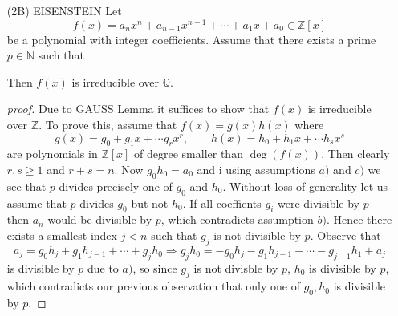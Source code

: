 \documentclass[]{scrartcl}
\newcommand{\Z}{\mathbb{Z}}
\newcommand{\<}{\trianglelefteq}
\begin{document}
\begin{itemize}
\begin{proof}[proof]
		We may therefore assume without loss of generality that $ p $ divides all coefficients of $ g'(x) $. 
		Hence we can write $ g'(x) = p g''(x) $ where $ g''(x) $ is again contained in $ \Z[x] $. 
		We may now divide the equation $ n f(x) = p g''(x) h'(x) $ by $ p $, and still remain within 
		$ \Z[x] $. Proceeding in this way we see that we can factorise $ f(x) $ over $ \Z[x] $.
	\end{proof}
	\begin{proof}[proof sketch]
	\end{proof}
	\item[(2B)] EISENSTEIN Let 
	$$ 
	f(x) = a_n x^n + a_{n - 1}x^{n - 1} + \cdots + a_1 x + a_0 \in \mathbb{Z}[x] 
	$$ 
	be a polynomial with integer coefficients. Assume that there exists a prime $ p \in \mathbb{N} $ 
	such that 
	Then $ f(x) $ is irreducible over $ \mathbb{Q} $. 
	\begin{proof}[proof]
		Due to GAUSS Lemma it 
		suffices to show that $ f(x) $ is irreducible over $ \mathbb{Z} $. To prove 
		this, assume that $ f(x) = g(x) h(x) $ where 
		$$
		g(x) = g_0 + g_1 x + \cdots g_r x^r, \qquad h(x) = h_0 + h_1 x + \cdots h_s x^s
		$$ 
		are polynomials in $ \mathbb{Z}[x] $ of degree smaller than $ \deg(f(x)) $. Then clearly $ r, s \geq 1 $ and 
		$ r + s = n $. Now $ g_0 h_0 = a_0 $ and 
		i%
		using
		assumptions $ a) $ and $ c) $ we see that $ p $ divides 
		precisely one of $ g_0 $ and $ h_0 $. 
		Without loss of generality let us assume that $ p $
		divides $ g_0 $ but not $h_0$. 
		If all coeffients $ g_i $ were divisible by $ p $ then $ a_n $ would be divisible by $ p $, which 
		contradicts assumption $ b) $. Hence there exists a smallest 
		index $ j < n $ such that $ g_j $ is 
		not divisible by $ p $. Observe that  
		$$
		a_j = g_0 h_j + g_1 h_{j - 1} + \cdots + g_j h_0 
		\Rightarrow 
		g_j h_0 = 
		-g_0 h_j - g_1 h_{j - 1} - \cdots - g_{j-1} h_1 +
		a_j
		$$
		is divisible by $ p $ due to $ a) $, so since $g_j$ is
		not divisble by $p$, 
		$ h_0 $ is divisible by $ p $, 
		which contradicts our previous observation that only
		one of $g_0,h_0$ is divisible by $p$. 
	\end{proof}

\end{itemize}
\end{document}
